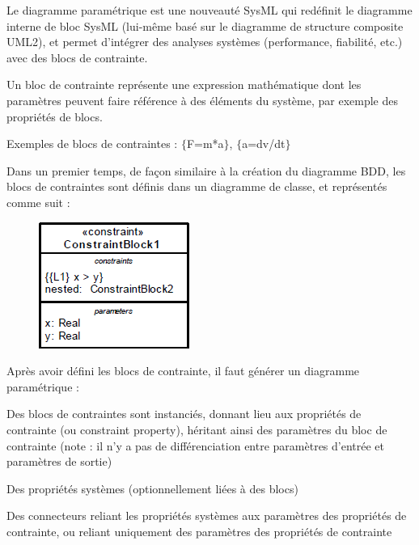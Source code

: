 \documentclass[12pt,a4paper]{report}
\begin{document}
\noindent \begin{flushleft}
	Le diagramme param\'{e}trique est une nouveaut\'{e} SysML qui red\'{e}finit le diagramme interne de bloc SysML (lui-m\^{e}me bas\'{e} sur le diagramme de structure composite UML2), et permet d'int\'{e}grer des analyses syst\`{e}mes (performance, fiabilit\'{e}, etc.) avec des blocs de contrainte.
	
	\noindent Un bloc de contrainte repr\'{e}sente une expression math\'{e}matique dont les param\`{e}tres peuvent faire r\'{e}f\'{e}rence \`{a} des \'{e}l\'{e}ments du syst\`{e}me, par exemple des propri\'{e}t\'{e}s de blocs.
	
	\noindent Exemples de blocs de contraintes : $\mathrm{\{}$F=m*a$\mathrm{\}}$, $\mathrm{\{}$a=dv/dt$\mathrm{\}}$
	
	\noindent Dans un premier temps, de fa\c{c}on similaire \`{a} la cr\'{e}ation du diagramme BDD, les blocs de contraintes sont d\'{e}finis dans un diagramme de classe, et repr\'{e}sent\'{e}s comme suit :
	
	\noindent 
	
	\begin{figure}[h]
		\centering
		\includegraphics[width=0.4\linewidth]{image16.png}
	\end{figure}
	
	
	
	\noindent Apr\`{e}s avoir d\'{e}fini les blocs de contrainte, il faut g\'{e}n\'{e}rer un diagramme param\'{e}trique :
	
	\noindent Des blocs de contraintes sont instanci\'{e}s, donnant lieu aux propri\'{e}t\'{e}s de contrainte (ou constraint property), h\'{e}ritant ainsi des param\`{e}tres du bloc de contrainte (note : il n'y a pas de diff\'{e}renciation entre param\`{e}tres d'entr\'{e}e et param\`{e}tres de sortie)
	
	\noindent Des propri\'{e}t\'{e}s syst\`{e}mes (optionnellement li\'{e}es \`{a} des blocs)
	
	\noindent Des connecteurs reliant les propri\'{e}t\'{e}s syst\`{e}mes aux param\`{e}tres des propri\'{e}t\'{e}s de contrainte, ou reliant uniquement des param\`{e}tres des propri\'{e}t\'{e}s de contrainte
\end{flushleft}
\end{document}
